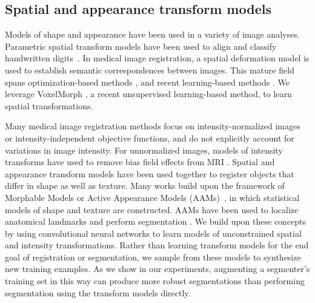 \documentclass[10pt,twocolumn,letterpaper]{article}
\begin{document}
\subsection{Spatial and appearance transform models}
Models of shape and appearance have been used in a variety of image analyses. Parametric spatial transform models have been used to align and classify handwritten digits~\cite{hauberg2016dreaming,learned2006data,miller2000learning}. In medical image registration, a spatial deformation model is used to establish semantic correspondences between images. This mature field spans optimization-based methods \cite{ashburner2000,bajcsy1989,rueckert1999,shen2002}, and recent learning-based methods \cite{ balakrishnan2018unsupervised,balakrishnan2019voxelmorph,dalca2018unsupervised,krebs2017,rohe2017,sokooti2017,yang2017}.  We leverage VoxelMorph \cite{balakrishnan2018unsupervised,balakrishnan2019voxelmorph}, a recent unsupervised learning-based method, to learn spatial transformations.

Many medical image registration methods focus on intensity-normalized images or intensity-independent objective functions, and do not explicitly account for variations in image intensity. For unnormalized images, models of intensity transforms have used to remove bias field effects from MRI \cite{learned2006data,wells1996adaptive}. Spatial and appearance transform models have been used together to register objects that differ in shape as well as texture. Many works build upon the framework of Morphable Models \cite{jones1998multidimensional} or Active Appearance Models (AAMs)~\cite{cootes1999unified,cootes2001active}, in which statistical models of shape and texture are constructed. AAMs have been used to localize anatomical landmarks \cite{cootes2001statistical,potesil2015personalized} and perform segmentation \cite{mitchell20023,patenaude2011bayesian,vincent2012fully}. We build upon these concepts by using convolutional neural networks to learn models of unconstrained spatial and intensity transformations. Rather than learning transform models for the end goal of registration or segmentation, we sample from these models to synthesize new training examples. As we show in our experiments, augmenting a segmenter's training set in this way can produce more robust segmentations than performing segmentation using the transform models directly.
\end{document}
